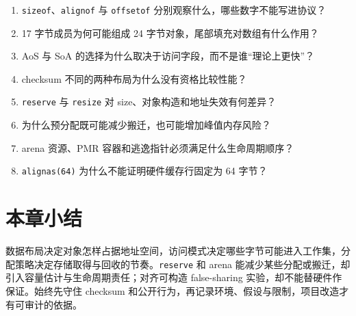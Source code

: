 \begin{enumerate}
  \item \texttt{sizeof}、\texttt{alignof} 与 \texttt{offsetof} 分别观察什么，哪些数字不能写进协议？
  \item 17 字节成员为何可能组成 24 字节对象，尾部填充对数组有什么作用？
  \item AoS 与 SoA 的选择为什么取决于访问字段，而不是谁“理论上更快”？
  \item checksum 不同的两种布局为什么没有资格比较性能？
  \item \texttt{reserve} 与 \texttt{resize} 对 size、对象构造和地址失效有何差异？
  \item 为什么预分配既可能减少搬迁，也可能增加峰值内存风险？
  \item arena 资源、PMR 容器和逃逸指针必须满足什么生命周期顺序？
  \item \texttt{alignas(64)} 为什么不能证明硬件缓存行固定为 64 字节？
\end{enumerate}


\section{本章小结}

数据布局决定对象怎样占据地址空间，访问模式决定哪些字节可能进入工作集，分配策略决定存储取得与回收的节奏。\texttt{reserve} 和 arena 能减少某些分配或搬迁，却引入容量估计与生命周期责任；对齐可构造 false-sharing 实验，却不能替硬件作保证。始终先守住 checksum 和公开行为，再记录环境、假设与限制，项目改造才有可审计的依据。
